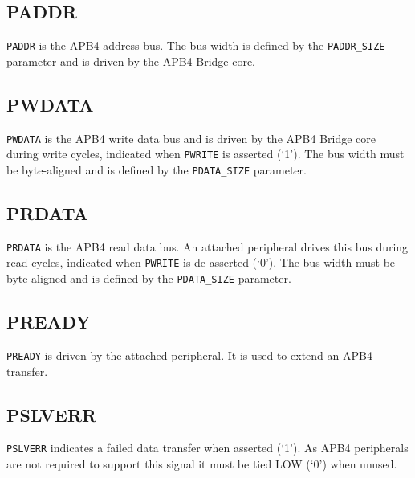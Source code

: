 \subsection{PADDR}\label{paddr}

\texttt{PADDR} is the APB4 address bus. The bus width is defined by the
\texttt{PADDR\_SIZE} parameter and is driven by the APB4 Bridge core.

\subsection{PWDATA}\label{pwdata}

\texttt{PWDATA} is the APB4 write data bus and is driven by the APB4 Bridge core
during write cycles, indicated when \texttt{PWRITE} is asserted (`1'). The bus
width must be byte-aligned and is defined by the \texttt{PDATA\_SIZE} parameter.

\subsection{PRDATA}\label{prdata}

\texttt{PRDATA} is the APB4 read data bus. An attached peripheral drives this bus
during read cycles, indicated when \texttt{PWRITE} is de-asserted (`0'). The bus
width must be byte-aligned and is defined by the \texttt{PDATA\_SIZE} parameter.

\subsection{PREADY}\label{pready}

\texttt{PREADY} is driven by the attached peripheral. It is used to extend an
APB4 transfer.

\subsection{PSLVERR}\label{pslverr}

\texttt{PSLVERR} indicates a failed data transfer when asserted (`1'). As APB4
peripherals are not required to support this signal it must be tied LOW
(`0') when unused.